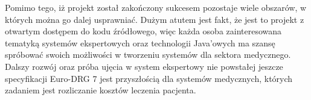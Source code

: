 Pomimo tego, iż projekt został zakończony sukcesem pozostaje wiele obszarów, w których można go dalej usprawniać. Dużym atutem jest fakt, że jest to projekt z otwartym dostępem do kodu źródłowego, więc każda osoba zainteresowana tematyką systemów ekspertowych oraz technologii Java'owych ma szansę spróbować swoich możliwości w tworzeniu systemów dla sektora medycznego. Dalszy rozwój oraz próba ujęcia w system ekspertowy nie powstałej jeszcze specyfikacji Euro-DRG 7 jest przyszłością dla systemów medycznych, których zadaniem jest rozliczanie kosztów leczenia pacjenta.
